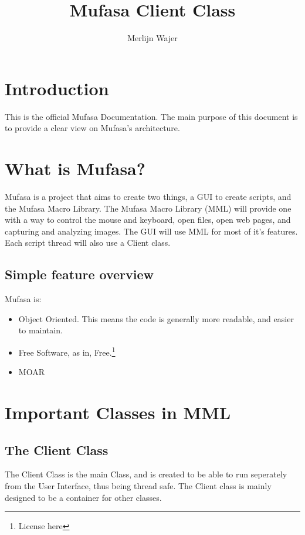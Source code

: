 \documentclass[a4paper, 10pt]{article}
\begin{document}
\title{Mufasa Client Class}
\author{Merlijn Wajer}
\maketitle

\section{Introduction}

This is the official Mufasa Documentation.
The main purpose of this document is to provide a clear view on Mufasa's architecture.

\section{What is Mufasa?}

Mufasa is a project that aims to create two things, a GUI to create scripts, and the Mufasa Macro Library.
The Mufasa Macro Library (MML) will provide one with a way to control the mouse and keyboard, open files, open web pages, and capturing and analyzing images.
The GUI will use MML for most of it's features. Each script thread will also use a Client class.

\subsection{Simple feature overview}

Mufasa is:
\begin{itemize}
	\item Object Oriented. This means the code is generally more
		  readable, and easier to maintain.
	\item Free Software, as in, Free.\footnote{License here}
	\item MOAR
\end{itemize}

\section{Important Classes in MML}

\subsection{The Client Class}

The Client Class is the main Class, and is created to be able
 to run seperately from the User Interface, thus being thread safe.
The Client class is mainly designed to be a container for other classes.
\end{document}
